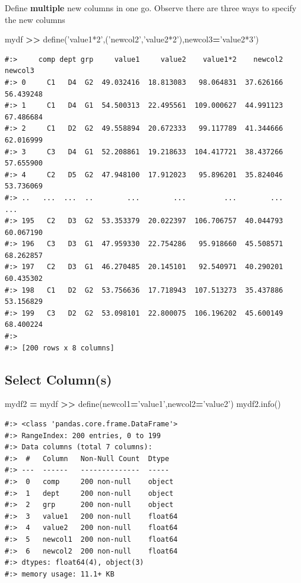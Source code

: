 \documentclass[
]{book}
\newenvironment{Shaded}{\begin{snugshade}}{\end{snugshade}}
\newcommand{\NormalTok}[1]{#1}
\newcommand{\OperatorTok}[1]{\textcolor[rgb]{0.43,0.43,0.43}{\textbf{#1}}}
\newcommand{\StringTok}[1]{\textcolor[rgb]{0.5,0.5,0.5}{#1}}
\begin{document}
Define \textbf{multiple} new columns in one go. Observe there are three ways to specify the new columns

\begin{Shaded}
\begin{Highlighting}[]
\NormalTok{mydf }\OperatorTok{>>}\NormalTok{ define(}\StringTok{'value1*2'}\NormalTok{,(}\StringTok{'newcol2'}\NormalTok{,}\StringTok{'value2*2'}\NormalTok{),newcol3}\OperatorTok{=}\StringTok{'value2*3'}\NormalTok{)}
\end{Highlighting}
\end{Shaded}

\begin{verbatim}
#:>     comp dept grp     value1     value2    value1*2    newcol2    newcol3
#:> 0     C1   D4  G2  49.032416  18.813083   98.064831  37.626166  56.439248
#:> 1     C1   D4  G1  54.500313  22.495561  109.000627  44.991123  67.486684
#:> 2     C1   D2  G2  49.558894  20.672333   99.117789  41.344666  62.016999
#:> 3     C3   D4  G1  52.208861  19.218633  104.417721  38.437266  57.655900
#:> 4     C2   D5  G2  47.948100  17.912023   95.896201  35.824046  53.736069
#:> ..   ...  ...  ..        ...        ...         ...        ...        ...
#:> 195   C2   D3  G2  53.353379  20.022397  106.706757  40.044793  60.067190
#:> 196   C3   D3  G1  47.959330  22.754286   95.918660  45.508571  68.262857
#:> 197   C2   D3  G1  46.270485  20.145101   92.540971  40.290201  60.435302
#:> 198   C1   D2  G2  53.756636  17.718943  107.513273  35.437886  53.156829
#:> 199   C3   D2  G2  53.098101  22.800075  106.196202  45.600149  68.400224
#:> 
#:> [200 rows x 8 columns]
\end{verbatim}

\hypertarget{select-columns}{%
\subsection{Select Column(s)}\label{select-columns}}

\begin{Shaded}
\begin{Highlighting}[]
\NormalTok{mydf2 }\OperatorTok{=}\NormalTok{ mydf }\OperatorTok{>>}\NormalTok{ define(newcol1}\OperatorTok{=}\StringTok{'value1'}\NormalTok{,newcol2}\OperatorTok{=}\StringTok{'value2'}\NormalTok{)}
\NormalTok{mydf2.info()}
\end{Highlighting}
\end{Shaded}

\begin{verbatim}
#:> <class 'pandas.core.frame.DataFrame'>
#:> RangeIndex: 200 entries, 0 to 199
#:> Data columns (total 7 columns):
#:>  #   Column   Non-Null Count  Dtype  
#:> ---  ------   --------------  -----  
#:>  0   comp     200 non-null    object 
#:>  1   dept     200 non-null    object 
#:>  2   grp      200 non-null    object 
#:>  3   value1   200 non-null    float64
#:>  4   value2   200 non-null    float64
#:>  5   newcol1  200 non-null    float64
#:>  6   newcol2  200 non-null    float64
#:> dtypes: float64(4), object(3)
#:> memory usage: 11.1+ KB
\end{verbatim}
\end{document}
